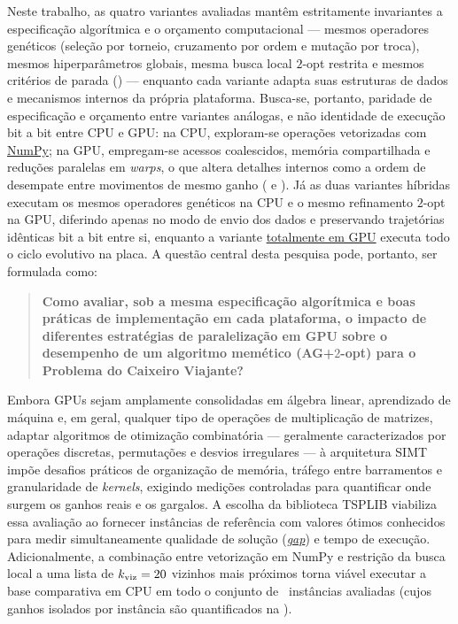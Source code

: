 Neste trabalho, as quatro variantes avaliadas mantêm estritamente invariantes a especificação algorítmica e o orçamento computacional --- mesmos operadores genéticos (seleção por torneio, cruzamento por ordem e mutação por troca), mesmos hiperparâmetros globais, mesma busca local \(2\)-opt restrita e mesmos critérios de parada () --- enquanto cada variante adapta suas estruturas de dados e mecanismos internos da própria plataforma.
Busca-se, portanto, paridade de especificação e orçamento entre variantes análogas, e não identidade de execução bit a bit entre CPU e GPU: na CPU, exploram-se operações vetorizadas com \hyperlink{term:numpy}{NumPy}; na GPU, empregam-se acessos coalescidos, memória compartilhada e reduções paralelas em \emph{warps}, o que altera detalhes internos como a ordem de desempate entre movimentos de mesmo ganho ( e ).
Já as duas variantes híbridas executam os mesmos operadores genéticos na CPU e o mesmo refinamento \(2\)-opt na GPU, diferindo apenas no modo de envio dos dados e preservando trajetórias idênticas bit a bit entre si, enquanto a variante \hyperlink{term:full-gpu}{totalmente em GPU} executa todo o ciclo evolutivo na placa.
A questão central desta pesquisa pode, portanto, ser formulada como:

\begin{quote}
      \textbf{Como avaliar, sob a mesma especificação algorítmica e boas práticas de implementação em cada plataforma, o impacto de diferentes estratégias de paralelização em GPU sobre o desempenho de um algoritmo memético (AG+\(2\)-opt) para o Problema do Caixeiro Viajante?}
\end{quote}

Embora GPUs sejam amplamente consolidadas em álgebra linear, aprendizado de máquina e, em geral, qualquer tipo de operações de multiplicação de matrizes, adaptar algoritmos de otimização combinatória --- geralmente caracterizados por operações discretas, permutações e desvios irregulares --- à arquitetura SIMT impõe desafios práticos de organização de memória, tráfego entre barramentos e granularidade de \emph{kernels}, exigindo medições controladas para quantificar onde surgem os ganhos reais e os gargalos.
A escolha da biblioteca TSPLIB \autocite{reinelt1991tsplib} viabiliza essa avaliação ao fornecer instâncias de referência com valores ótimos conhecidos para medir simultaneamente qualidade de solução (\hyperlink{term:gap}{\emph{gap}}) e tempo de execução.
Adicionalmente, a combinação entre vetorização em NumPy e restrição da busca local a uma lista de \(k_{\text{viz}} = 20\) vizinhos mais próximos torna viável executar a base comparativa em CPU em todo o conjunto de \totalinstancias\ instâncias avaliadas (cujos ganhos isolados por instância são quantificados na ).

